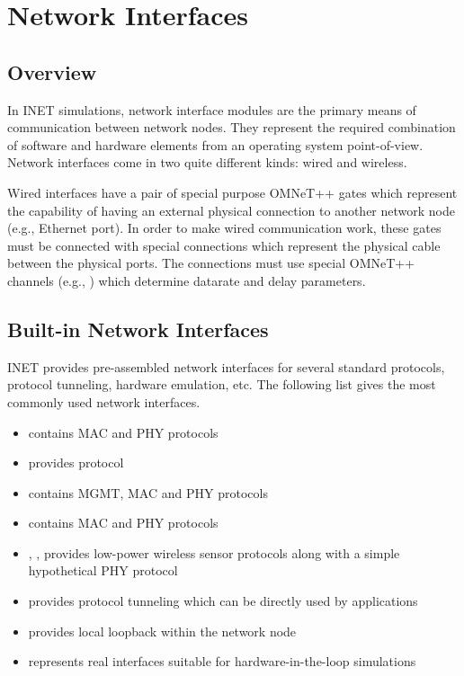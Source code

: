 \chapter{Network Interfaces}
\label{cha:network-interfaces}

\section{Overview}


In INET simulations, network interface modules are the primary means of
communication between network nodes. They represent the required
combination of software and hardware elements from an operating system
point-of-view. Network interfaces come in two quite different kinds: wired
and wireless.

Wired interfaces have a pair of special purpose OMNeT++ gates which represent
the capability of having an external physical connection to another network
node (e.g., Ethernet port). In order to make wired communication work,
these gates must be connected with special connections which represent the
physical cable between the physical ports. The connections must use special
OMNeT++ channels (e.g., ) which determine datarate
and delay parameters.


\section{Built-in Network Interfaces}

INET provides pre-assembled network interfaces for several standard
protocols, protocol tunneling, hardware emulation, etc. The following list
gives the most commonly used network interfaces.

\begin{itemize}
        \item {} contains  MAC and PHY protocols
        \item {} provides  protocol
        \item {} contains  MGMT, MAC and PHY protocols
        \item {} contains  MAC and PHY protocols
        \item {}, ,  provides low-power wireless sensor protocols along with a simple hypothetical PHY protocol
        \item {} provides protocol tunneling which can be directly used by applications
        \item {} provides local loopback within the network node
        \item {} represents real interfaces suitable for hardware-in-the-loop simulations
\end{itemize}

